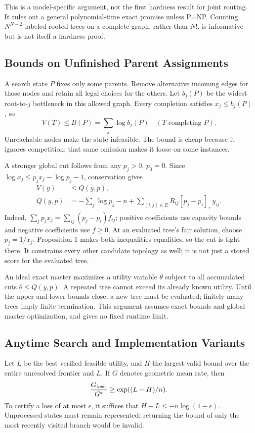 \documentclass[conference,letterpaper]{IEEEtran}
\newcommand{\pos}[1]{[#1]_+}
\begin{document}
This is a model-specific argument, not the first hardness result for joint routing. It rules out a general polynomial-time exact promise unless P=NP. Counting $N^{N-2}$ labeled rooted trees on a complete graph, rather than $N!$, is informative but is not itself a hardness proof.

\subsection{Bounds on Unfinished Parent Assignments}
A search state $P$ fixes only some parents. Remove alternative incoming edges for those nodes and retain all legal choices for the others. Let $b_j(P)$ be the widest root-to-$j$ bottleneck in this allowed graph. Every completion satisfies $x_j\le b_j(P)$, so
\begin{equation}
V(T)\le B(P)=\sum_j\log b_j(P)\quad(T\text{ completing }P).
\end{equation}
Unreachable nodes make the state infeasible. The bound is cheap because it ignores competition; that same omission makes it loose on some instances.

A stronger global cut follows from any $p_j>0$, $p_0=0$. Since $\log x_j\le p_jx_j-\log p_j-1$, conservation gives
\begin{align}
V(y)&\le Q(y,p),\label{eq:cut}\\
Q(y,p)&=-\sum_j\log p_j-n+
\sum_{(i,j)\in E}R_{ij}\pos{p_j-p_i}y_{ij}.\nonumber
\end{align}
Indeed, $\sum_jp_jx_j=\sum_{ij}(p_j-p_i)f_{ij}$; positive coefficients use capacity bounds and negative coefficients use $f\ge0$. At an evaluated tree's fair solution, choose $p_j=1/x_j$. Proposition 1 makes both inequalities equalities, so the cut is tight there. It constrains every other candidate topology as well; it is not just a stored score for the evaluated tree.

An ideal exact master maximizes a utility variable $\theta$ subject to all accumulated cuts $\theta\le Q(y,p)$. A repeated tree cannot exceed its already known utility. Until the upper and lower bounds close, a new tree must be evaluated; finitely many trees imply finite termination. This argument assumes exact bounds and global master optimization, and gives no fixed runtime limit.

\subsection{Anytime Search and Implementation Variants}
Let $L$ be the best verified feasible utility, and $H$ the largest valid bound over the entire unresolved frontier and $L$. If $G$ denotes geometric mean rate, then
\begin{equation}
\frac{G_{\rm best}}{G^*}\ge\exp((L-H)/n).
\label{eq:certificate}
\end{equation}
To certify a loss of at most $\epsilon$, it suffices that $H-L\le-n\log(1-\epsilon)$. Unprocessed states must remain represented; returning the bound of only the most recently visited branch would be invalid.
\end{document}
